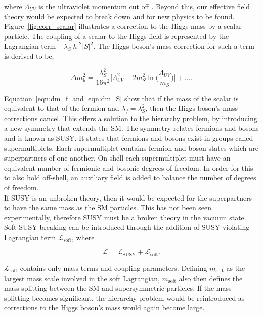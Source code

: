 where \(\Lambda_{UV}\) is the ultraviolet momentum cut off \cite{SUSY_Primer}.
Beyond this, our effective field theory would be expected to break down and for new physics to be found. \\

Figure~\ref{fig:corr_scalar} illustrates a correction to the Higgs mass by a scalar particle. 
The coupling of a scalar to the Higgs field is represented by the Lagrangian term $-\lambda_S |h|^2 |S|^2$. 
The Higgs boson's mass correction for such a term is derived to be,

\begin{equation}
    \Delta m_{\text{h}}^{2} =  \frac{\lambda_{S}^{2}}{16\pi^2}\Big[\Lambda_{UV}^{2} -2m_{S}^{2} \ln\Big(\frac{\Lambda_{UV}}{m_S}\Big) \Big] + ... .
    \label{eqn:dm_S}
\end{equation}

Equation~\ref{eqn:dm_f} and \ref{eqn:dm_S} show that if the mass of the scalar is equivalent to that of the fermion and $\lambda_f = \lambda_{S}^{2}$, then the Higgs boson's mass corrections cancel. 
This offers a solution to the hierarchy problem, by introducing a new symmetry that extends the \ac{SM}. 
The symmetry relates fermions and bosons and is known as \ac{SUSY}. 
It states that fermions and bosons exist in groups called supermultiplets. 
Each supermultiplet contains fermion and boson states which are superpartners of one another. 
On-shell each supermultiplet must have an equivalent number of fermionic and bosonic degrees of freedom. 
In order for this to also hold off-shell, an auxiliary field is added to balance the number of degrees of freedom. \\

If \ac{SUSY} is an unbroken theory, then it would be expected for the superpartners to have the same mass as the \ac{SM} particles. 
This has not been seen experimentally, therefore \ac{SUSY} must be a broken theory in the vacuum state. 
Soft \ac{SUSY} breaking can be introduced through the addition of \ac{SUSY} violating Lagrangian term $\mathcal{L}_{\text{soft}}$, where

\begin{equation}
    \mathcal{L} = \mathcal{L}_{\text{SUSY}} + \mathcal{L}_{\text{soft}}.
\end{equation}

$\mathcal{L}_{\text{soft}}$ contains only mass terms and coupling parameters. 
Defining $m_{\text{soft}}$ as the largest mass scale involved in the soft Lagrangian, $m_{\text{soft}}$ also then defines the mass splitting between the \ac{SM} and supersymmetric particles. 
If the mass splitting becomes significant, the hierarchy problem would be reintroduced as corrections to the Higgs boson's mass would again become large. \\

